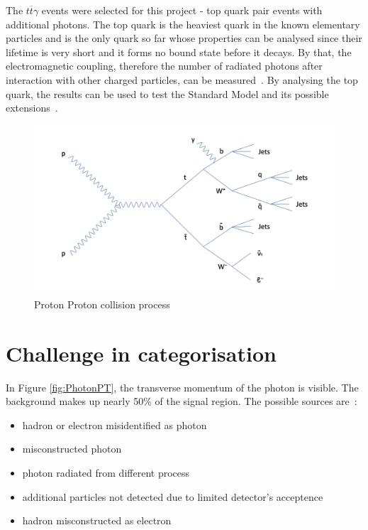 \documentclass[11pt]{scrartcl}
\begin{document}
	The $t\overline{t}\gamma$ events were selected for this project - top quark pair events with additional photons. The top quark is the heaviest quark in the known elementary particles and is the only quark so far whose properties can be analysed since their lifetime is very short and it forms no bound state before it decays. By that, the electromagnetic coupling, therefore the number of radiated photons after interaction with other charged particles, can be measured~\cite{TTG}. By analysing the top quark, the results can be used to test the Standard Model and its possible extensions~\cite{ATLAS}.
	
	\begin{figure}[H]
	\centering
	\includegraphics[width=1\textwidth]{figures/PP_process.png}
	\caption{Proton Proton collision process}
 	\label{fig:PPprocess}
	\end{figure}
	
\section{Challenge in categorisation}

In Figure \ref{fig:PhotonPT}, the transverse momentum of the photon is visible. The background makes up nearly 50\% of the signal region. The possible sources are~\cite{ATLAS, TTG}:
\begin{itemize}
  \item hadron or electron misidentified as photon
  \item misconstructed photon
  \item photon radiated from different process
  \item additional particles not detected due to limited detector's acceptence
  \item hadron misconstructed as electron
\end{itemize}
\end{document}
